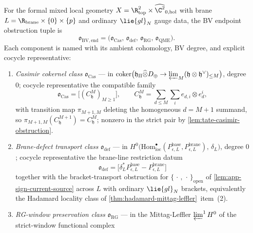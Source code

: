 \begin{defn}
\label{defn:bv-endpoint-obstruction-tuple}
  For the formal mixed local geometry
  \(X=\R^2_{\mathrm{top}}\times\widehat{\C^2}_{0,\mathrm{hol}}\) with
  brane \(L=\R_{\mathrm{brane}}\times\{0\}\times\{p\}\) and ordinary
  \(\lie{gl}_N\) gauge data, the BV endpoint obstruction tuple is
  \[
    \mathfrak o_{\mathrm{BV,end}}
      =\bigl(
        \mathfrak o_{\mathrm{Cas}},\,
        \mathfrak o_{\mathrm{def}},\,
        \mathfrak o_{\mathrm{RG}},\,
        \mathfrak o_{\mathrm{QME}}
       \bigr).
  \]
  Each component is named with its ambient cohomology, BV degree,
  and explicit cocycle representative:
  \begin{enumerate}[label=(O\arabic*)]
    \item \emph{Casimir cokernel class
      \(\mathfrak o_{\mathrm{Cas}}\)} --- in
      \(\mathrm{coker}\bigl(\mathfrak h_\Pi\widehat\otimes D_\oplus
      \to\varprojlim_M(\mathfrak h\otimes\mathfrak h^\vee)_{\le M}\bigr)\),
      degree \(0\); cocycle representative the compatible family
	      \[
	        \mathfrak o_{\mathrm{Cas}}=
	        \bigl[(C^M_{\mathfrak h})_{M\ge1}\bigr],
	        \qquad
	        C^M_{\mathfrak h}=\sum_{d\le M}\sum_ie_{d,i}\otimes e^i_d,
	      \]
	      with transition map \(\pi_{M+1,M}\) deleting the homogeneous
	      \(d=M+1\) summand, so
	      \(\pi_{M+1,M}(C^{M+1}_{\mathfrak h})=C^M_{\mathfrak h}\);
	      nonzero in
	      the strict pair by \ref{lem:tate-casimir-obstruction}.
    \item \emph{Brane-defect transport class
      \(\mathfrak o_{\mathrm{def}}\)} --- in
      \(H^0\!\bigl(\mathrm{Hom}^\bullet_{\mathrm{loc}}
        (P^{\mathrm{base}}_{\epsilon,L},
         P^{\mathrm{brane}}_{\epsilon,L}),\,\delta_L\bigr)\),
      degree \(0\); cocycle representative the brane-line restriction
      datum
      \[
        \mathfrak o_{\mathrm{def}}=
        \bigl[\delta_L^*P^{\mathrm{base}}_{\epsilon,L}
          -P^{\mathrm{brane}}_{\epsilon,L}\bigr]
      \]
      together with the bracket-transport obstruction for
      \(\{\,\cdot\,,\,\cdot\,\}_{\mathrm{open}}\) of
      \ref{lem:app-sign-current-source} across \(L\) with ordinary
      \(\lie{gl}_N\) brackets, equivalently the Hadamard locality
      class of \ref{thm:hadamard-mittag-leffler}~item~(2).
    \item \emph{RG-window preservation class
      \(\mathfrak o_{\mathrm{RG}}\)} --- in the Mittag-Leffler
      \(\varprojlim^1H^0\) of the strict-window functional complex

\end{enumerate}
\end{defn}
